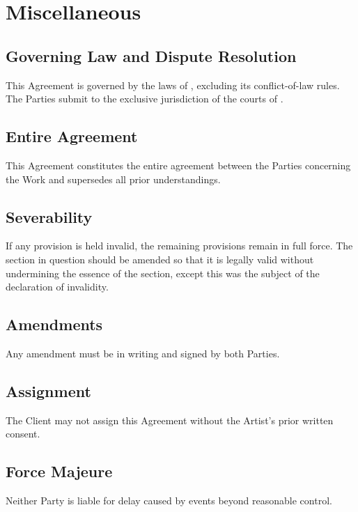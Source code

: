 \section{Miscellaneous}


\subsection{Governing Law and Dispute Resolution}
This Agreement is governed by the laws of \doclawsof, excluding its 
conflict-of-law rules. 
The Parties submit to the exclusive jurisdiction of the courts of \doccourt.


\subsection{Entire Agreement}
This Agreement constitutes the entire agreement between the Parties concerning 
the Work and supersedes all prior understandings.


\subsection{Severability}
If any provision is held invalid, the remaining provisions remain in full force.
The section in question should be amended so that it is legally valid without 
undermining the essence of the section, except this was the subject of the 
declaration of invalidity.


\subsection{Amendments}
Any amendment must be in writing and signed by both Parties.

\subsection{Assignment}
The Client may not assign this Agreement without the Artist's prior 
written consent.


\subsection{Force Majeure}
Neither Party is liable for delay caused by events beyond reasonable control.
